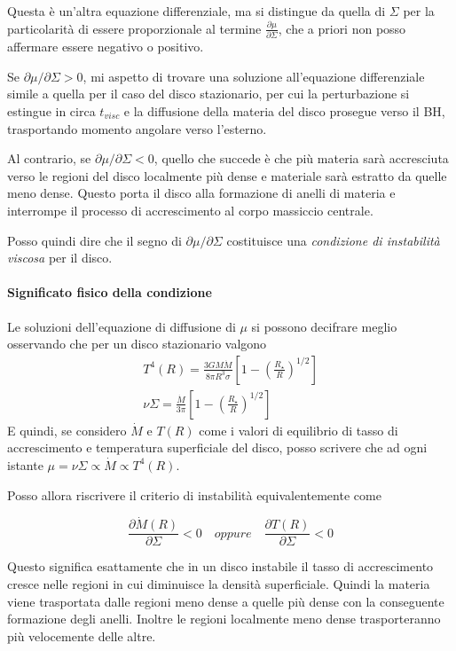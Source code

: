 \documentclass[a4paperbi]{article}
\begin{document}
	Questa è un'altra equazione differenziale, ma si distingue da quella di $\Sigma$ per la particolarità di essere proporzionale al termine $\frac{\partial\mu}{\partial\Sigma}$, che a priori non posso affermare essere negativo o positivo.
	
	Se $\partial\mu/\partial\Sigma>0$, mi aspetto di trovare una soluzione all'equazione differenziale simile a quella per il caso del disco stazionario, per cui la perturbazione si estingue in circa $t_{visc}$ e la diffusione della materia del disco prosegue verso il BH, trasportando momento angolare verso l'esterno. 
	
	Al contrario, se $\partial\mu/\partial\Sigma<0$, quello che succede è che più materia sarà accresciuta verso le regioni del disco localmente più dense e materiale sarà estratto da quelle meno dense. Questo porta il disco alla formazione di anelli di materia e interrompe il processo di accrescimento al corpo massiccio centrale.
	
	Posso quindi dire che il segno di $\partial\mu/\partial\Sigma$ costituisce una \textit{condizione di instabilità viscosa} per il disco.
	
	\paragraph{Significato fisico della condizione}
	Le soluzioni dell'equazione di diffusione di $\mu$ si possono decifrare meglio osservando che per un disco stazionario valgono
	\begin{gather*}
				T^4(R)=\frac{3GM\dot{M}}{8\pi R^3\sigma}\left[1-\left(\frac{R_{\star}}{R}\right)^{1/2}\right]\\
				\nu\Sigma=\frac{\dot{M}}{3\pi}\left[1-\left(\frac{R_{\star}}{R}\right)^{1/2}\right]
	\end{gather*}
	E quindi, se considero $\dot{M}$ e $T(R)$ come i valori di equilibrio di tasso di accrescimento e temperatura superficiale del disco, posso scrivere che ad ogni istante $\mu=\nu\Sigma\propto\dot{M}\propto T^4(R)$.
	
	Posso allora riscrivere il criterio di instabilità equivalentemente come
	
	\begin{equation*}
		\frac{\partial\dot{M}(R)}{\partial\Sigma}<0\quad\textit{oppure}\quad\frac{\partial T(R)}{\partial\Sigma}<0
	\end{equation*}
	
	Questo significa esattamente che in un disco instabile il tasso di accrescimento cresce nelle regioni in cui diminuisce la densità superficiale. Quindi la materia viene trasportata dalle regioni meno dense a quelle più dense con la conseguente formazione degli anelli. Inoltre le regioni localmente meno dense trasporteranno più velocemente delle altre.
	
\end{document}
